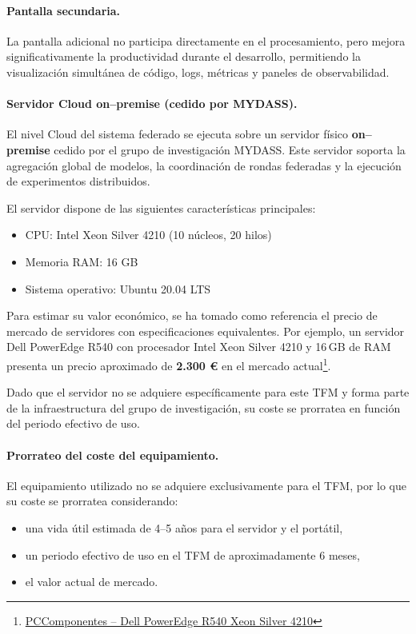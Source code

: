 \documentclass{report}
\begin{document}
\paragraph{Pantalla secundaria.}
La pantalla adicional no participa directamente en el procesamiento, pero mejora significativamente la productividad durante el desarrollo, permitiendo la visualización simultánea de código, logs, métricas y paneles de observabilidad.

\paragraph{Servidor Cloud on--premise (cedido por MYDASS).}
El nivel Cloud del sistema federado se ejecuta sobre un servidor físico \textbf{on--premise} cedido por el grupo de investigación MYDASS.  
Este servidor soporta la agregación global de modelos, la coordinación de rondas federadas y la ejecución de experimentos distribuidos.

El servidor dispone de las siguientes características principales:
\begin{itemize}
    \item CPU: Intel Xeon Silver 4210 (10 núcleos, 20 hilos)
    \item Memoria RAM: 16 GB
    \item Sistema operativo: Ubuntu 20.04 LTS
\end{itemize}

Para estimar su valor económico, se ha tomado como referencia el precio de mercado de servidores con especificaciones equivalentes.  
Por ejemplo, un servidor Dell PowerEdge R540 con procesador Intel Xeon Silver 4210 y 16\,GB de RAM presenta un precio aproximado de \textbf{2.300 €} en el mercado actual\footnote{\href{https://www.pccomponentes.com/dell-poweredge-r540-xeon-silver-4210-16gb}{PCComponentes – Dell PowerEdge R540 Xeon Silver 4210}}.

Dado que el servidor no se adquiere específicamente para este TFM y forma parte de la infraestructura del grupo de investigación, su coste se prorratea en función del periodo efectivo de uso.

\paragraph{Prorrateo del coste del equipamiento.}
El equipamiento utilizado no se adquiere exclusivamente para el TFM, por lo que su coste se prorratea considerando:
\begin{itemize}
    \item una vida útil estimada de 4–5 años para el servidor y el portátil,
    \item un periodo efectivo de uso en el TFM de aproximadamente 6 meses,
    \item el valor actual de mercado.
\end{itemize}
\end{document}
